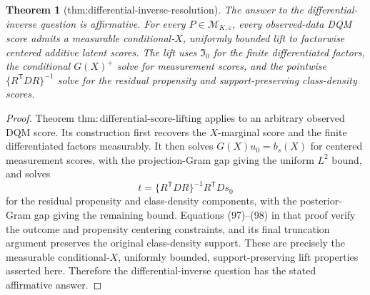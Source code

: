 \documentclass{article}
\newtheorem{theorem}{Theorem}
\begin{document}
\begin{theorem}[thm:differential-inverse-resolution]\label{thm:differential-inverse-resolution}
The answer to the differential-inverse question is affirmative.  For every \(P\in\mathcal M_{K,\varepsilon}\), every observed-data DQM score admits a measurable conditional-\(X\), uniformly bounded lift to factorwise centered additive latent scores.  The lift uses \(\mathfrak I_0\) for the finite differentiated factors, the conditional \(G(X)^+\) solve for measurement scores, and the pointwise \(\{R^{\mathsf T}DR\}^{-1}\) solve for the residual propensity and support-preserving class-density scores.
\end{theorem}
\begin{proof}
Theorem \(\mathrm{thm{:}differential\mbox{-}score\mbox{-}lifting}\) applies to an arbitrary observed DQM score.  Its construction first recovers the \(X\)-marginal score and the finite differentiated factors measurably.  It then solves \(G(X)u_0=b_s(X)\) for centered measurement scores, with the projection-Gram gap giving the uniform \(L^2\) bound, and solves
\[
t=\{R^{\mathsf T}DR\}^{-1}R^{\mathsf T}Ds_0
\]
for the residual propensity and class-density components, with the posterior-Gram gap giving the remaining bound.  Equations (97)--(98) in that proof verify the outcome and propensity centering constraints, and its final truncation argument preserves the original class-density support.  These are precisely the measurable conditional-\(X\), uniformly bounded, support-preserving lift properties asserted here.  Therefore the differential-inverse question has the stated affirmative answer.
\end{proof}
\end{document}
